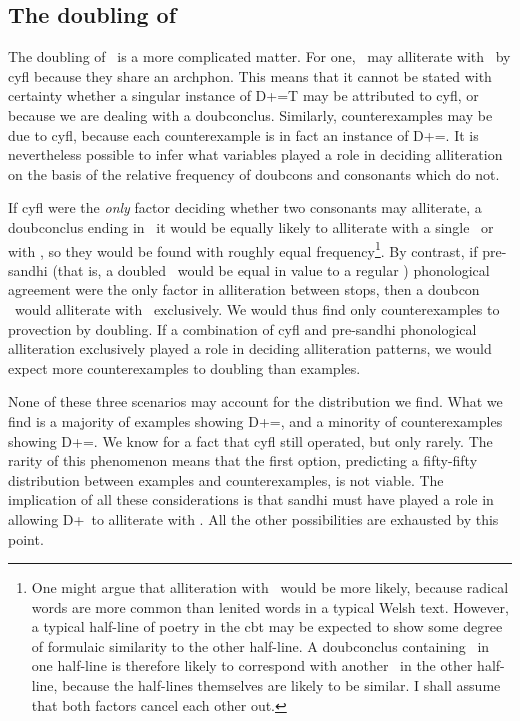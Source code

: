 \subsection{The doubling of {\lT}}
The doubling of \lT\ is a more complicated matter. For one, \lT\ may alliterate with \xT\ by \gls{cyfl} because they share an \gls{archphon}. This means that it cannot be stated with certainty whether a singular instance of \gls{D}+\lT=\gls{T} may be attributed to \gls{cyfl}, or because we are dealing with a \gls{doubconclus}. Similarly, counterexamples may be due to \gls{cyfl}, because each counterexample is in fact an instance of \gls{D}+\lT=\lT. It is nevertheless possible to infer what variables played a role in deciding alliteration on the basis of the relative frequency of \gls{doubcon}s and consonants which do not. 

If \gls{cyfl} were the \emph{only} factor deciding whether two consonants may alliterate, a \gls{doubconclus} ending in \lT\ it would be equally likely to alliterate with a single \lT\ or with \xT, so they would be found with  roughly equal frequency\footnote{One might argue that alliteration with \xT\ would be more likely, because radical words are more common than lenited words in a typical Welsh text. However, a typical half-line of poetry in the \gls{cbt} may be expected to show some degree of formulaic similarity to the other half-line. A \gls{doubconclus} containing \lT\ in one half-line is therefore likely to correspond with another \lT\ in the other half-line, because the half-lines themselves are likely to be similar. I shall assume that both factors cancel each other out.}.
By contrast, if pre-sandhi (that is, a doubled \lT\ would be equal in value to a regular \lT) phonological agreement were the only factor in alliteration between stops, then a \gls{doubcon} \lT\ would alliterate with \lT\ exclusively. We would thus find only counterexamples to provection by doubling. If a combination of \gls{cyfl} and pre-sandhi phonological alliteration exclusively played a role in deciding alliteration patterns, we would expect more counterexamples to doubling than examples.

None of these three scenarios may account for the distribution we find. What we find is a majority of examples showing \gls{D}+\lT=\xT, and a minority of counterexamples showing \gls{D}+\lT=\lT. We know for a fact that \gls{cyfl} still operated, but only rarely. The rarity of this phenomenon means that the first option, predicting a fifty-fifty distribution between examples and counterexamples, is not viable. The implication of all these considerations is that sandhi must have played a role in allowing \gls{D}+\lT\ to alliterate with \xT. All the other possibilities are exhausted by this point. 


